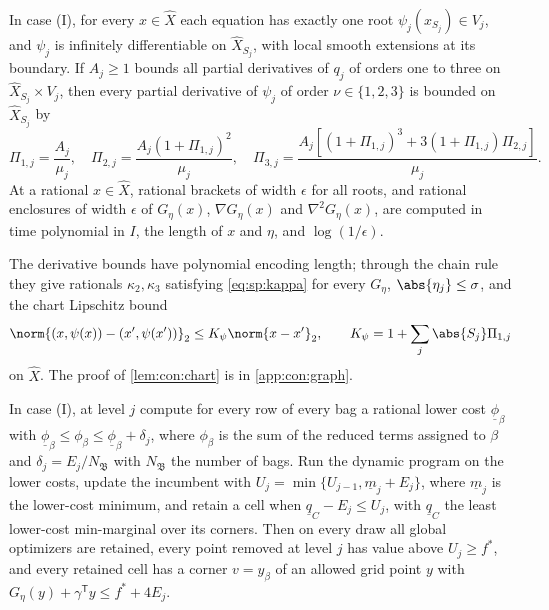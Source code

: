 \begin{lemma}[Chart]\label{lem:con:chart}
In case (I), for every $x\in\widehat X$ each equation has exactly one root
$\psi_j(x_{S_j})\in V_j$, and $\psi_j$ is infinitely differentiable on
$\widehat X_{S_j}$, with local smooth extensions at its boundary. If
$A_j\ge1$ bounds all partial derivatives of $q_j$ of orders one to three on
$\widehat X_{S_j}\times V_j$, then every partial derivative of $\psi_j$ of
order $\nu\in\{1,2,3\}$ is bounded on $\widehat X_{S_j}$ by
\[
 \Pi_{1,j}=\frac{A_j}{\mu_j},\quad
 \Pi_{2,j}=\frac{A_j(1+\Pi_{1,j})^2}{\mu_j},\quad
 \Pi_{3,j}=\frac{A_j[(1+\Pi_{1,j})^3+3(1+\Pi_{1,j})\Pi_{2,j}]}{\mu_j}.
\]
At a rational $x\in\widehat X$, rational brackets of width $\epsilon$ for all
roots, and rational enclosures of width $\epsilon$ of $G_\eta(x)$,
$\nabla G_\eta(x)$ and $\nabla^2G_\eta(x)$, are computed in time polynomial in
$I$, the length of $x$ and $\eta$, and $\log(1/\epsilon)$.
\end{lemma}

The derivative bounds have polynomial encoding length; through the chain
rule they give rationals $\kappa_2,\kappa_3$ satisfying \eqref{eq:sp:kappa}
for every $G_\eta$, $\abs{\eta_j}\le\sigma$, and the chart Lipschitz bound
\begin{equation}\label{eq:con:Kpsi}
 \norm{(x,\psi(x))-(x',\psi(x'))}_2\le K_\psi\norm{x-x'}_2,
 \qquad K_\psi=1+\sum_j\abs{S_j}\Pi_{1,j}
\end{equation}
on $\widehat X$. The proof of \cref{lem:con:chart} is in \cref{app:con:graph}.

\begin{lemma}\label{lem:con:approx}
In case (I), at level $j$ compute for every row of every bag a rational lower
cost $\underline\phi_\beta$ with
$\underline\phi_\beta\le\phi_\beta\le\underline\phi_\beta+\delta_j$, where
$\phi_\beta$ is the sum of the reduced terms assigned to $\beta$ and
$\delta_j=E_j/N_{\mathfrak B}$ with $N_{\mathfrak B}$ the number of bags. Run
the dynamic program on the lower costs, update the incumbent with
$U_j=\min\{U_{j-1},\underline m_j+E_j\}$, where $\underline m_j$ is the
lower-cost minimum, and retain a cell when $\underline q_C-E_j\le U_j$, with
$\underline q_C$ the least lower-cost min-marginal over its corners. Then on
every draw all global optimizers are retained, every point removed at level
$j$ has value above $U_j\ge f^*$, and every retained cell has a corner
$v=y_\beta$ of an allowed grid point $y$ with
$G_\eta(y)+\gamma^{\mathsf T}y\le f^*+4E_j$.
\end{lemma}

